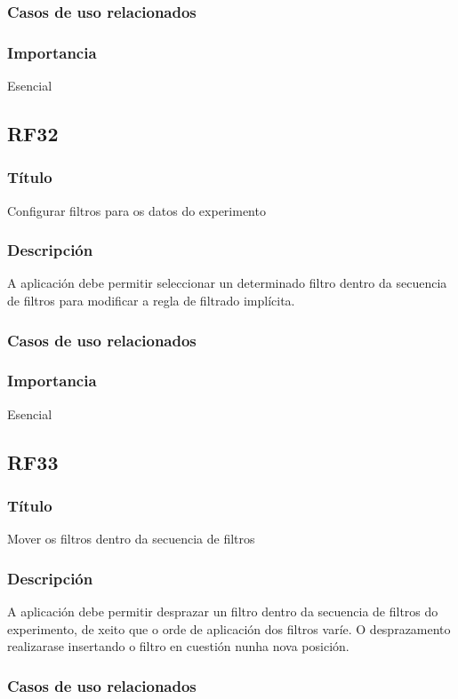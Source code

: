 \subsubsection{Casos de uso relacionados}
\subsubsection{Importancia}
Esencial

\subsection{RF32}
\subsubsection{Título}
Configurar filtros para os datos do experimento
\subsubsection{Descripción}
A aplicación debe permitir seleccionar un determinado filtro dentro da secuencia de filtros para modificar a regla de filtrado implícita.
\subsubsection{Casos de uso relacionados}
\subsubsection{Importancia}
Esencial

\subsection{RF33}
\subsubsection{Título}
Mover os filtros dentro da secuencia de filtros
\subsubsection{Descripción}
A aplicación debe permitir desprazar un filtro dentro da secuencia de filtros do experimento, de xeito que o orde de aplicación dos filtros varíe. O desprazamento realizarase insertando o filtro en cuestión nunha nova posición.
\subsubsection{Casos de uso relacionados}
